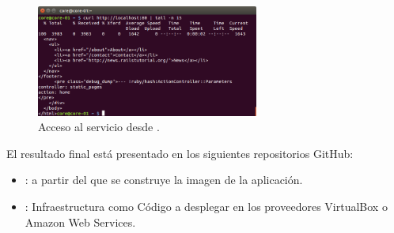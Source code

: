 \begin{figure}[H]
\centering
\includegraphics[width=0.65\textwidth]{images/figures/curl-vbox.png}
\caption{Acceso al servicio desde .}
\end{figure}

El resultado final está presentado en los siguientes repositorios GitHub:
\begin{itemize}
\item {}: a partir del que se construye la imagen de la aplicación.
\item {}: Infraestructura como Código a desplegar en los proveedores VirtualBox o Amazon Web Services.
\end{itemize}